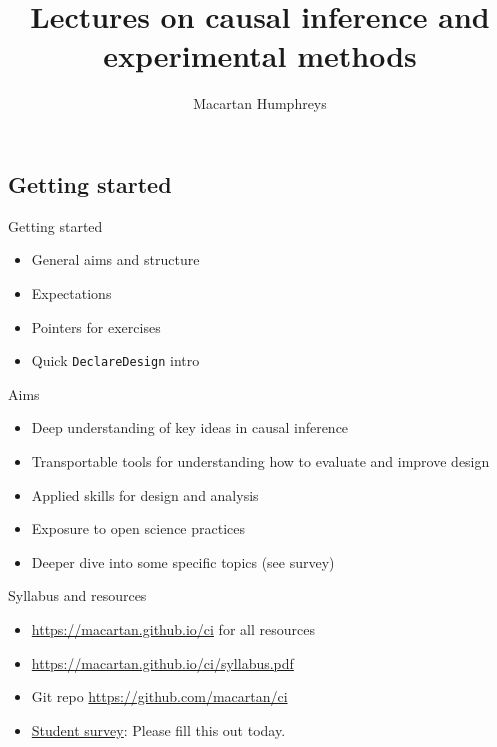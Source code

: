\documentclass[
  11pt,
  ignorenonframetext,
]{beamer}
\title{Lectures on causal inference and experimental methods}
\author{Macartan Humphreys}
\date{}
\providecommand{\tightlist}{%
  \setlength{\itemsep}{0pt}\setlength{\parskip}{0pt}}\usepackage{longtable,booktabs,array}
\begin{document}
\frame{\titlepage}
\ifdefined\Shaded\renewenvironment{Shaded}{\begin{tcolorbox}[boxrule=0pt, breakable, enhanced, frame hidden, sharp corners, interior hidden, borderline west={3pt}{0pt}{shadecolor}]}{\end{tcolorbox}}\fi

\hypertarget{secoutline}{%
\subsection{Getting started}\label{secoutline}}

\begin{frame}[fragile]{Getting started}
\begin{itemize}
\tightlist
\item
  General aims and structure
\item
  Expectations
\item
  Pointers for exercises
\item
  Quick \texttt{DeclareDesign} intro
\end{itemize}
\end{frame}

\begin{frame}{Aims}
\protect\hypertarget{aims}{}
\begin{itemize}
\tightlist
\item
  Deep understanding of key ideas in causal inference
\item
  Transportable tools for understanding how to evaluate and improve
  design
\item
  Applied skills for design and analysis
\item
  Exposure to open science practices
\item
  Deeper dive into some specific topics (see survey)
\end{itemize}
\end{frame}

\begin{frame}{Syllabus and resources}
\protect\hypertarget{syllabus-and-resources}{}
\begin{itemize}
\tightlist
\item
  \url{https://macartan.github.io/ci} for all resources
\item
  \url{https://macartan.github.io/ci/syllabus.pdf}
\item
  Git repo \url{https://github.com/macartan/ci}
\item
  \href{https://cloud.wzb.eu/apps/forms/s/8QmokT5GeQfkmkrBHDzrzN4j}{Student
  survey}: Please fill this out today.
\end{itemize}
\end{frame}
\end{document}
